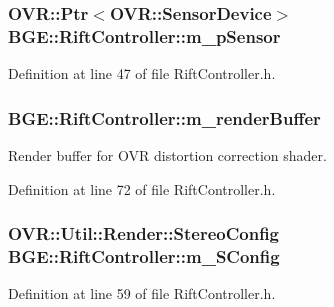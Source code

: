 \hypertarget{class_b_g_e_1_1_rift_controller_a4e43e42cb597307332164d1bbb25e354}{
\subsubsection[{m\-\_\-p\-Sensor}]{\setlength{\rightskip}{0pt plus 5cm}O\-V\-R\-::\-Ptr$<$O\-V\-R\-::\-Sensor\-Device$>$ B\-G\-E\-::\-Rift\-Controller\-::m\-\_\-p\-Sensor}}\label{class_b_g_e_1_1_rift_controller_a4e43e42cb597307332164d1bbb25e354}


Definition at line 47 of file Rift\-Controller.\-h.

\hypertarget{class_b_g_e_1_1_rift_controller_a54f7b611ddef0e08d4a45586d4bca2e4}{
\subsubsection[{m\-\_\-render\-Buffer}]{ B\-G\-E\-::\-Rift\-Controller\-::m\-\_\-render\-Buffer}}\label{class_b_g_e_1_1_rift_controller_a54f7b611ddef0e08d4a45586d4bca2e4}


Render buffer for O\-V\-R distortion correction shader. 



Definition at line 72 of file Rift\-Controller.\-h.

\hypertarget{class_b_g_e_1_1_rift_controller_a2b05217b23794266f4502f3b259f1ce6}{
\subsubsection[{m\-\_\-\-S\-Config}]{\setlength{\rightskip}{0pt plus 5cm}O\-V\-R\-::\-Util\-::\-Render\-::\-Stereo\-Config B\-G\-E\-::\-Rift\-Controller\-::m\-\_\-\-S\-Config}}\label{class_b_g_e_1_1_rift_controller_a2b05217b23794266f4502f3b259f1ce6}


Definition at line 59 of file Rift\-Controller.\-h.

